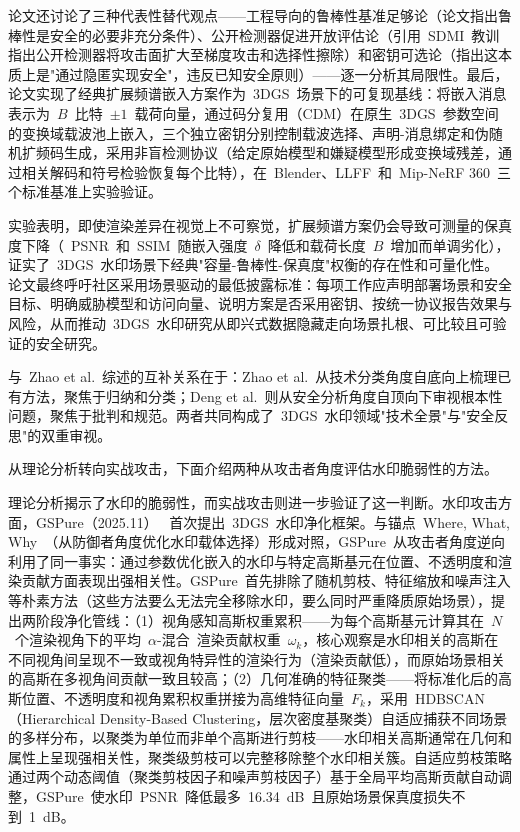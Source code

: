 论文还讨论了三种代表性替代观点——工程导向的鲁棒性基准足够论（论文指出鲁棒性是安全的必要非充分条件）、公开检测器促进开放评估论（引用~SDMI~教训指出公开检测器将攻击面扩大至梯度攻击和选择性擦除）和密钥可选论（指出这本质上是"通过隐匿实现安全"，违反已知安全原则）——逐一分析其局限性。最后，论文实现了经典扩展频谱嵌入方案作为~3DGS~场景下的可复现基线：将嵌入消息表示为~$B$~比特~$\pm 1$~载荷向量，通过码分复用（CDM）在原生~3DGS~参数空间的变换域载波池上嵌入，三个独立密钥分别控制载波选择、声明-消息绑定和伪随机扩频码生成，采用非盲检测协议（给定原始模型和嫌疑模型形成变换域残差，通过相关解码和符号检验恢复每个比特），在~Blender、LLFF~和~Mip-NeRF 360~三个标准基准上实验验证。

实验表明，即使渲染差异在视觉上不可察觉，扩展频谱方案仍会导致可测量的保真度下降（~PSNR~和~SSIM~随嵌入强度~$\delta$~降低和载荷长度~$B$~增加而单调劣化），证实了~3DGS~水印场景下经典"容量-鲁棒性-保真度"权衡的存在性和可量化性。论文最终呼吁社区采用场景驱动的最低披露标准：每项工作应声明部署场景和安全目标、明确威胁模型和访问向量、说明方案是否采用密钥、按统一协议报告效果与风险，从而推动~3DGS~水印研究从即兴式数据隐藏走向场景扎根、可比较且可验证的安全研究。

与~Zhao et al.~综述的互补关系在于：Zhao et al.~从技术分类角度自底向上梳理已有方法，聚焦于归纳和分类；Deng et al.~则从安全分析角度自顶向下审视根本性问题，聚焦于批判和规范。两者共同构成了~3DGS~水印领域"技术全景"与"安全反思"的双重审视。

从理论分析转向实战攻击，下面介绍两种从攻击者角度评估水印脆弱性的方法。

理论分析揭示了水印的脆弱性，而实战攻击则进一步验证了这一判断。水印攻击方面，GSPure（2025.11）~\cite{2511_22262} 首次提出~3DGS~水印净化框架。与锚点~Where, What, Why~（从防御者角度优化水印载体选择）形成对照，GSPure~从攻击者角度逆向利用了同一事实：通过参数优化嵌入的水印与特定高斯基元在位置、不透明度和渲染贡献方面表现出强相关性。GSPure~首先排除了随机剪枝、特征缩放和噪声注入等朴素方法（这些方法要么无法完全移除水印，要么同时严重降质原始场景），提出两阶段净化管线：（1）视角感知高斯权重累积——为每个高斯基元计算其在~$N$~个渲染视角下的平均~$\alpha$-混合~渲染贡献权重~$\omega_k$，核心观察是水印相关的高斯在不同视角间呈现不一致或视角特异性的渲染行为（渲染贡献低），而原始场景相关的高斯在多视角间贡献一致且较高；（2）几何准确的特征聚类——将标准化后的高斯位置、不透明度和视角累积权重拼接为高维特征向量~$F_k$，采用~HDBSCAN（Hierarchical Density-Based Clustering，层次密度基聚类）自适应捕获不同场景的多样分布，以聚类为单位而非单个高斯进行剪枝——水印相关高斯通常在几何和属性上呈现强相关性，聚类级剪枝可以完整移除整个水印相关簇。自适应剪枝策略通过两个动态阈值（聚类剪枝因子和噪声剪枝因子）基于全局平均高斯贡献自动调整，GSPure~使水印~PSNR~降低最多~16.34~dB~且原始场景保真度损失不到~1~dB。

